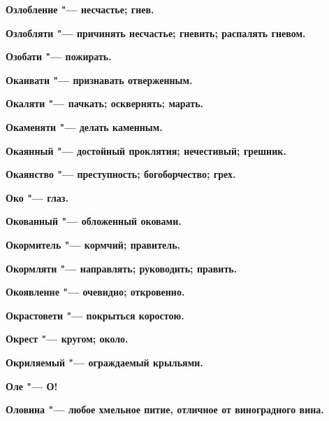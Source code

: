 \begin{mymulticols}{2}
\bfseries Озлобление\normalfont{} "--- несчастье; гнев. 




\bfseries Озлобляти\normalfont{} "--- причинять несчастье; гневить; распалять гневом. 




\bfseries Озобати\normalfont{} "--- пожирать. 




\bfseries Окаивати\normalfont{} "--- признавать отверженным. 




\bfseries Окаляти\normalfont{} "--- пачкать; осквернять; марать. 




\bfseries Окаменяти\normalfont{} "--- делать каменным. 




\bfseries Окаянный\normalfont{} "--- достойный проклятия; нечестивый; грешник. 




\bfseries Окаянство\normalfont{} "--- преступность; богоборчество; грех. 




\bfseries Око\normalfont{} "--- глаз. 




\bfseries Окованный\normalfont{} "--- обложенный оковами. 




\bfseries Окормитель\normalfont{} "--- кормчий; правитель. 




\bfseries Окормляти\normalfont{} "--- направлять; руководить; править. 




\bfseries Окоявленне\normalfont{} "--- очевидно; откровенно. 




\bfseries Окрастовети\normalfont{} "--- покрыться коростою. 




\bfseries Окрест\normalfont{} "--- кругом; около. 




\bfseries Окриляемый\normalfont{} "--- ограждаемый крыльями. 




\bfseries Оле\normalfont{} "--- О! 




\bfseries Оловина\normalfont{} "--- любое хмельное питие, отличное от виноградного вина. 





\end{mymulticols}
